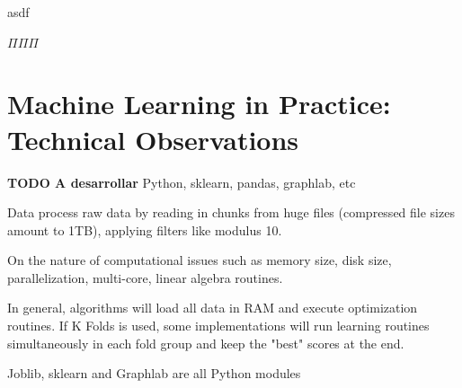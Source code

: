 asdf

$\Pi \Pi \Pi$


\section{Machine Learning in Practice: Technical Observations}\label{section-technicalObservations}
\textbf{TODO A desarrollar}
Python, sklearn, pandas, graphlab, etc

Data process raw data by reading in chunks from huge files (compressed file sizes amount to 1TB), applying filters like modulus 10.

On the nature of computational issues such as memory size, disk size, parallelization, multi-core, linear algebra routines.

In general, algorithms will load all data in RAM and execute optimization routines. If K Folds is used, some implementations will run learning routines simultaneously in each fold group and keep the "best" scores at the end.

Joblib, sklearn and Graphlab are all Python modules
